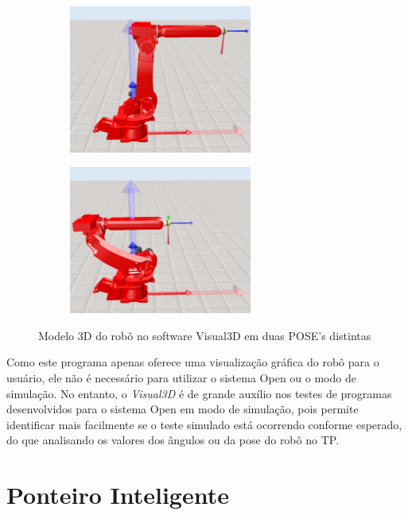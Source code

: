         \begin{figure}[h]
            \centering
            \begin{subfigure}[b]{0.4\textwidth}
                \centering
                \includegraphics[width=60mm]{imagens/Softwares/visual3d-a.png}
                \caption{}
                \label{fig:visuala}
            \end{subfigure}
            \hfill
            \begin{subfigure}[b]{0.4\textwidth}
                \centering
                \includegraphics[width=60mm]{imagens/Softwares/visual3d-b.png}
                \caption{}
                \label{fig:visualb}
            \end{subfigure}
            \caption{Modelo 3D do robô no software Visual3D em duas \ac{POSE}'s distintas}
            \label{fig:visual}
        \end{figure}
        
        Como este programa apenas oferece uma visualização gráfica do robô para o usuário, ele não é necessário para utilizar o sistema Open ou o modo de simulação. No entanto, o \textit{Visual3D} é de grande auxílio nos testes de programas desenvolvidos para o sistema Open em modo de simulação, pois permite identificar mais facilmente se o teste simulado está ocorrendo conforme esperado, do que analisando os valores dos ângulos ou da pose do robô no \ac{TP}.
    
    \section{Ponteiro Inteligente}

